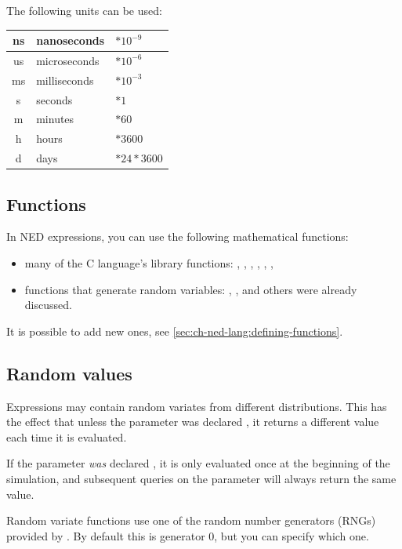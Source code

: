 The following units can be used:

\begin{longtable}{|c|l|l|}
\hline
ns & nanoseconds & $*10^{-9}$ \\\hline
us & microseconds & $*10^{-6}$ \\\hline
ms & milliseconds & $*10^{-3}$ \\\hline
s  & seconds & $*1$ \\\hline
m  & minutes & $*60$ \\\hline
h  & hours & $*3600$ \\\hline
d  & days & $*24*3600$ \\\hline
\end{longtable}




\subsection{Functions}

In NED expressions, you can use the following mathematical functions:
\begin{itemize}
  \item{many of the C language's  library functions:
    , , , , ,
    , }
  \item{functions that generate random variables: ,
    ,  and others were already
    discussed.}
\end{itemize}

It is possible to add new ones, see \ref{sec:ch-ned-lang:defining-functions}.

\subsection{Random values}

Expressions may contain random variates from different distributions.
This has the effect that unless the parameter was declared ,
it returns a different value each time it is evaluated.

If the parameter \textit{was} declared , it is only evaluated
once at the beginning of the simulation, and subsequent queries
on the parameter will always return the same value.

Random variate functions use one of the random number generators (RNGs)
provided by \opp. By default this is generator 0, but you can specify
which one.

